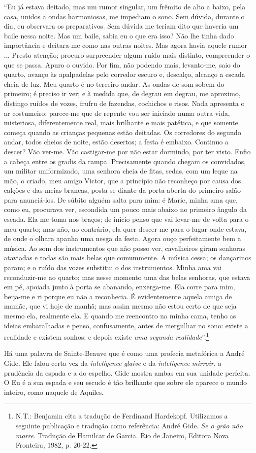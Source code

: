 ``Eu já estava deitado, mas um rumor singular, um frêmito de alto a
baixo, pela casa, unidos a ondas harmoniosas, me impediam o sono. Sem
dúvida, durante o dia, eu observara os preparativos. Sem dúvida me
teriam dito que haveria um baile nessa noite. Mas um baile, sabia eu o
que era isso? Não lhe tinha dado importância e deitara-me como nas
outras noites. Mas agora havia aquele rumor ... Presto atenção; procuro
surpreender algum ruído mais distinto, compreender o que se passa. Apuro
o ouvido. Por fim, não podendo mais, levanto-me, saio do quarto, avanço
às apalpadelas pelo corredor escuro e, descalço, alcanço a escada cheia
de luz. Meu quarto é no terceiro andar. As ondas de som sobem do
primeiro; é preciso ir ver; e à medida que, de degrau em degrau, me
aproximo, distingo ruídos de vozes, frufru de fazendas, cochichos e
risos. Nada apresenta o ar costumeiro; parece-me que de repente vou ser
iniciado numa outra vida, misteriosa, diferentemente real, mais
brilhante e mais patética, e que somente começa quando as crianças
pequenas estão deitadas. Os corredores do segundo andar, todos cheios de
noite, estão desertos; a festa é embaixo. Continuo a descer? Vão ver-me.
Vão castigar-me por não estar dormindo, por ter visto. Enfio a cabeça
entre os gradis da rampa. Precisamente quando chegam os convidados, um
militar uniformizado, uma senhora cheia de fitas, sedas, com um leque na
mão, o criado, meu amigo Victor, que a princípio não reconheço por causa
dos calções e das meias brancas, posta-se diante da porta aberta do
primeiro salão para anunciá-los. De súbito alguém salta para mim: é
Marie, minha ama que, como eu, procurava ver, escondida um pouco mais
abaixo no primeiro ângulo da escada. Ela me toma nos braços; de início
penso que vai levar-me de volta para o meu quarto; mas não, ao
contrário, ela quer descer-me para o lugar onde estava, de onde o olhara
apanha uma nesga da festa. Agora ouço perfeitamente bem a música. Ao som
dos instrumentos que não posso ver, cavalheiros giram senhoras ataviadas
e todas são mais belas que comummente. A música cessa; os dançarinos
param; e o ruído das vozes substitui o dos instrumentos. Minha ama vai
reconduzir-me ao quarto; mas nesse momento uma das belas senhoras, que
estava em pé, apoiada junto à porta se abanando, enxerga-me. Ela corre
para mim, beija-me e ri porque eu não a reconhecia. É evidentemente
aquela amiga de mamãe, que vi hoje de manhã; mas assim mesmo não estou
certo de que seja mesmo ela, realmente ela. E quando me reencontro na
minha cama, tenho as ideias embaralhadas e penso, confusamente, antes de
mergulhar no sono: existe a realidade e existem sonhos; e depois existe
\emph{uma segunda realidade}''.\footnote{N.T.: Benjamin cita a tradução
  de Ferdinand Hardekopf. Utilizamos a seguinte publicação e tradução
  como referência: André Gide. \emph{Se o grão não morre}. Tradução de
  Hamilcar de Garcia. Rio de Janeiro, Editora Nova Fronteira, 1982, p.
  20-22.}

Há uma palavra de Sainte-Beauve que é como uma profecia metafórica a
André Gide. Ele falou certa vez da \emph{inteligence} \emph{glaive} e da
\emph{inteligence} \emph{mirroir}, a prudência da espada e a do espelho.
Gide mostra ambas em sua unidade perfeita. O Eu é a sua espada e seu
escudo é tão brilhante que sobre ele aparece o mundo inteiro, como
naquele de Aquiles.
